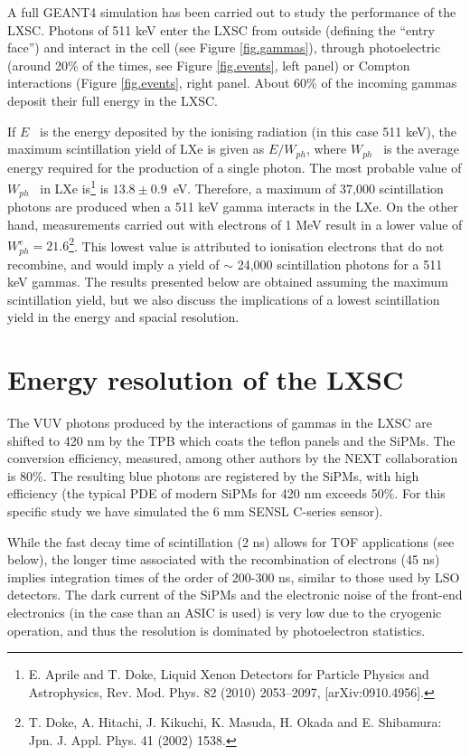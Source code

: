 \documentclass{JINST}
\begin{document}
A full GEANT4 simulation has been carried out to study the performance of the LXSC. Photons of 511 keV enter the LXSC from outside (defining the ``entry face'') and interact in the cell (see Figure \ref{fig.gammas}), through photoelectric (around 20\% of the times, see Figure \ref{fig.events}, left panel) or Compton interactions (Figure \ref{fig.events}, right panel. About 60\% of the incoming gammas deposit their full energy in the LXSC. 

If $E$~ is the energy deposited by the ionising radiation (in this case 511 keV), the maximum scintillation yield of LXe is given as $E/W_{ph}$, where $W_{ph}$~ is the average energy required for the production of a single photon. The most probable value of $W_{ph}$~ in LXe  is\footnote{E. Aprile and T. Doke, Liquid Xenon Detectors for Particle Physics and Astrophysics, Rev. Mod. Phys. 82 (2010) 2053–2097, [arXiv:0910.4956].} is $13.8 \pm 0.9$~eV. Therefore, a maximum of 37,000 scintillation photons are produced when a 511 keV gamma interacts in the LXe. On the other hand, measurements carried out with electrons of 1 MeV result in a lower value of $W_{ph}^e = 21.6$\footnote{T. Doke, A. Hitachi, J. Kikuchi, K. Masuda, H. Okada and E. Shibamura: Jpn. J. Appl. Phys. 41 (2002) 1538.}. This lowest value is attributed to ionisation electrons that do not recombine, and would imply a yield of $\sim$ 24,000 scintillation photons for a 511 keV gammas. The results presented below are obtained assuming the maximum scintillation yield, but we also discuss the implications of a lowest scintillation yield in the energy and spacial resolution. 

\section{Energy resolution of the LXSC}

The VUV photons produced by the interactions of gammas in the LXSC are shifted to 420 nm by the TPB which coats the teflon panels and the SiPMs. The conversion efficiency, measured, among other authors by the NEXT collaboration is 80\%. The resulting blue photons are registered by the SiPMs, with high efficiency (the typical PDE of modern SiPMs for 420 nm exceeds 50\%. For this specific study we have simulated the 6 mm SENSL C-series sensor). 

While the fast decay time of scintillation (2 ns) allows for TOF applications (see below), the longer time associated with the recombination of electrons (45 ns) implies integration times of the order of 200-300 ns, similar to those used by LSO detectors. The dark current of the SiPMs and the electronic noise of the front-end electronics (in the case than an ASIC is used) is very low due to the cryogenic operation, and thus the resolution is dominated by photoelectron statistics. 
\end{document}
